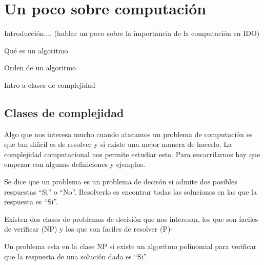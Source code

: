 \chapter{Un poco sobre computación}

Introducción.... (hablar un poco sobre la importancia de la computación en IDO)

\begin{dfn}
Qué es un algoritmo
\end{dfn}

\begin{dfn}
Orden de un algoritmo
\end{dfn}

Intro a clases de complejidad


\section{Clases de complejidad}
Algo que nos interesa mucho cuando atacamos un problema de computación es que tan dificíl es de resolver y si existe una mejor manera de hacerlo. La complejidad computacional nos permite estudiar esto. Para encarrilarnos hay que empezar con algunas definiciones y ejemplos.
\begin{dfn}
Se dice que un problema es un problema de decisón si admite dos posibles respuestas ``Si'' o ``No''. Resolverlo es encontrar todas las soluciones en las que la respuesta es ``Si''.
\end{dfn}
Existen dos clases de problemas de decisión que nos interesan, los que son faciles de verificar (NP) y los que son faciles de resolver (P)-
\begin{dfn}
Un problema esta en la clase NP si existe un algoritmo polinomial para verificar que la respuesta de una solución dada es ``Si''.
\end{dfn}


